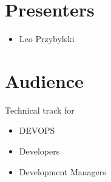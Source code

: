 \documentclass[12pt,notitlepage]{article}
\begin{document}
\section{Presenters}
\begin{itemize}
\item Leo Przybylski
\end{itemize}

\section{Audience}
Technical track for
\begin{itemize}
\item DEVOPS
\item Developers
\item Development Managers
\end{itemize}
\end{document}
